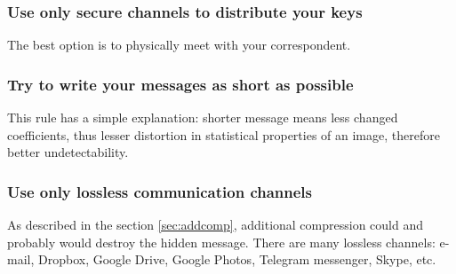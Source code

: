 \subsubsection{Use only secure channels to distribute your keys}
The best option is to physically meet with your correspondent.


\subsubsection{Try to write your messages as short as possible}
This rule has a simple explanation: shorter message means less changed coefficients, thus
lesser distortion in statistical properties of an image, therefore better undetectability.

\subsubsection{Use only lossless communication channels}
As described in the section \ref{sec:addcomp}, additional compression could and probably
would destroy the hidden message. There are many lossless channels: e-mail, Dropbox, Google Drive,
Google Photos, Telegram messenger, Skype, etc.
